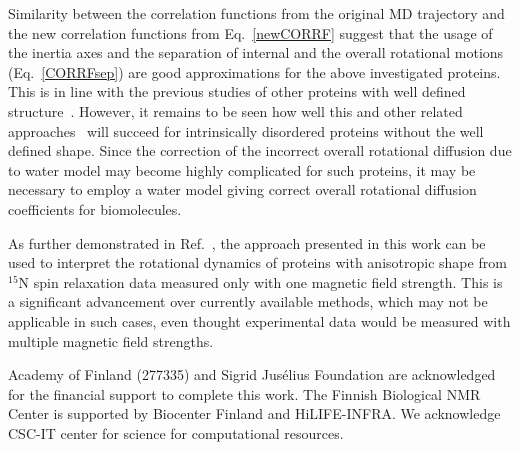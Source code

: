 \documentclass[journal=jpcbfk,manuscript=article]{achemso}
\begin{document}
Similarity between the correlation functions from the original MD trajectory and
the new correlation functions from Eq.~\ref{newCORRF} 
suggest that the usage of the inertia axes
and the separation of internal and the overall rotational motions
(Eq.~\ref{CORRFsep}) are good approximations for the above investigated
proteins. This is in line with the previous studies of other  
proteins with well defined structure~\cite{wong08,allner15}. However, it remains to be seen
how well this and other related approaches~\cite{prompers02,anderson12,chia18} 
will succeed for intrinsically disordered proteins without
the well defined shape. Since the correction of the incorrect overall
rotational diffusion due to water model may become highly complicated for such proteins,
it may be necessary to employ a water model giving correct
overall rotational diffusion coefficients for biomolecules.

As further demonstrated in Ref.~, the approach presented in this work can be used to interpret the
rotational dynamics of proteins with anisotropic shape from $^{15}$N
spin relaxation data measured only with one magnetic field strength.
This is a significant advancement over currently available methods,
which may not be applicable in such cases, even thought experimental
data would be measured with multiple magnetic field strengths.


\begin{acknowledgement}
  Academy of Finland (277335) and Sigrid Jus{\' e}lius Foundation are acknowledged for the financial support
  to complete this work. The Finnish Biological NMR Center is supported by Biocenter Finland and HiLIFE-INFRA.
  We acknowledge CSC-IT center for science for computational resources.
\end{acknowledgement}
\end{document}
